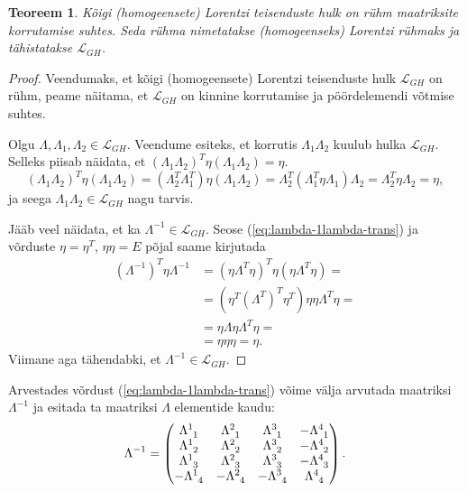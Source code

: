 \documentclass[12pt,a4paper,oneside]{article}
\theoremstyle{plain}
\newtheorem{teoreem}{Teoreem}[section]
\theoremstyle{definition}
\numberwithin{equation}{section}
\def\L{{\mathcal L}}
\begin{document}
\begin{teoreem}
Kõigi (homogeensete) Lorentzi teisenduste hulk on rühm maatriksite 
korrutamise suhtes. Seda rühma nimetatakse \emph{(homogeenseks) 
Lorentzi rühmaks} ja tähistatakse $\L_{GH}$.
\end{teoreem}

\begin{proof}
Veendumaks, et kõigi (homogeensete) Lorentzi teisenduste hulk 
$\L_{GH}$ on rühm, peame näitama, et $\L_{GH}$ on kinnine korrutamise 
ja pöörd\-elemendi võtmise suhtes.

Olgu $\Lambda, \Lambda_1, \Lambda_2 \in \L_{GH}$. Veendume esiteks, 
et korrutis $\Lambda_1 \Lambda_2$ kuulub hulka $\L_{GH}$. Selleks 
piisab näidata, et $\left(\Lambda_1 \Lambda_2\right)^T \eta 
\left(\Lambda_1 \Lambda_2\right) = \eta$.
\begin{equation*}
\left(\Lambda_1 \Lambda_2\right)^T \eta 
\left(\Lambda_1 \Lambda_2\right) = 
\left(\Lambda_2^T \Lambda_1^T\right) \eta 
\left(\Lambda_1 \Lambda_2\right) = \Lambda_2^T 
\left(\Lambda_1^T \eta \Lambda_1 \right) \Lambda_2 = 
\Lambda_2^T \eta \Lambda_2 = \eta,
\end{equation*}
ja seega $\Lambda_1 \Lambda_2 \in \L_{GH}$ nagu tarvis.

Jääb veel näidata, et ka $\Lambda^{-1 } \in \L_{GH}$. Seose 
(\ref{eq:lambda-1lambda-trans}) ja võrduste $\eta = \eta^T$, 
$\eta \eta = E$ põjal saame kirjutada
\begin{align*}
\left(\Lambda^{-1}\right)^T \eta \Lambda^{-1} &= 
\left(\eta \Lambda^T \eta \right)^T \eta 
\left(\eta \Lambda^T \eta\right) = \\
&= \left(\eta^T \left(\Lambda^T\right)^T \eta^T \right) 
\eta \eta \Lambda^T \eta = \\
&= \eta \Lambda \eta \Lambda^T \eta = \\
&= \eta \eta \eta = \eta.
\end{align*}
Viimane aga tähendabki, et $\Lambda^{-1} \in \L_{GH}$.
\end{proof}

Arvestades võrdust (\ref{eq:lambda-1lambda-trans}) võime välja 
arvutada maatriksi $\Lambda^{-1}$ ja esitada ta maatriksi $\Lambda$ 
elementide kaudu:
\[\Lambda^{-1} = \begin{pmatrix}
\Lambda\indices{^1_1} & \Lambda\indices{^2_1} & 
	\Lambda\indices{^3_1} & -\Lambda\indices{^4_1} \\ 
\Lambda\indices{^1_2} & \Lambda\indices{^2_2} & 
	\Lambda\indices{^3_2} & -\Lambda\indices{^4_2} \\  
\Lambda\indices{^1_3} & \Lambda\indices{^2_3} & 
	\Lambda\indices{^3_3} & -\Lambda\indices{^4_3} \\ 
-\Lambda\indices{^1_4} & -\Lambda\indices{^2_4} & 
	-\Lambda\indices{^3_4} & \Lambda\indices{^4_4} \\ 
\end{pmatrix}.\]
\end{document}
